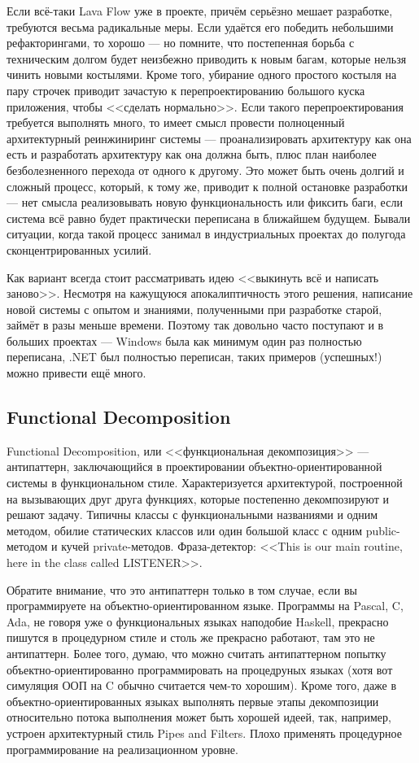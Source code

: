 \documentclass{../../text-style}
\begin{document}
Если всё-таки Lava Flow уже в проекте, причём серьёзно мешает разработке, требуются весьма радикальные меры. Если удаётся его победить небольшими рефакторингами, то хорошо --- но помните, что постепенная борьба с техническим долгом будет неизбежно приводить к новым багам, которые нельзя чинить новыми костылями. Кроме того, убирание одного простого костыля на пару строчек приводит зачастую к перепроектированию большого куска приложения, чтобы <<сделать нормально>>. Если такого перепроектирования требуется выполнять много, то имеет смысл провести полноценный архитектурный реинжиниринг системы --- проанализировать архитектуру как она есть и разработать архитектуру как она должна быть, плюс план наиболее безболезненного перехода от одного к другому. Это может быть очень долгий и сложный процесс, который, к тому же, приводит к полной остановке разработки --- нет смысла реализовывать новую функциональность или фиксить баги, если система всё равно будет практически переписана в ближайшем будущем. Бывали ситуации, когда такой процесс занимал в индустриальных проектах до полугода сконцентрированных усилий. 

Как вариант всегда стоит рассматривать идею <<выкинуть всё и написать заново>>. Несмотря на кажущуюся апокалиптичность этого решения, написание новой системы с опытом и знаниями, полученными при разработке старой, займёт в разы меньше времени. Поэтому так довольно часто поступают и в больших проектах --- Windows была как минимум один раз полностью переписана, .NET был полностью переписан, таких примеров (успешных!) можно привести ещё много.

\subsection{Functional Decomposition}

Functional Decomposition, или <<функциональная декомпозиция>> --- антипаттерн, заключающийся в проектировании объектно-ориентированной системы в функциональном стиле. Характеризуется архитектурой, построенной на вызывающих друг друга функциях, которые постепенно декомпозируют и решают задачу. Типичны классы с функциональными названиями и одним методом, обилие статических классов или один большой класс с одним public-методом и кучей private-методов. Фраза-детектор: <<This is our main routine, here in the class called LISTENER>>.

Обратите внимание, что это антипаттерн только в том случае, если вы программируете на объектно-ориентированном языке. Программы на Pascal, C, Ada, не говоря уже о функциональных языках наподобие Haskell, прекрасно пишутся в процедурном стиле и столь же прекрасно работают, там это не антипаттерн. Более того, думаю, что можно считать антипаттерном попытку объектно-ориентированно программировать на процедруных языках (хотя вот симуляция ООП на C обычно считается чем-то хорошим). Кроме того, даже в объектно-ориентированных языках выполнять первые этапы  декомпозиции относительно потока выполнения может быть хорошей идеей, так, например, устроен архитектурный стиль Pipes and Filters. Плохо применять процедурное программирование на реализационном уровне.
\end{document}
